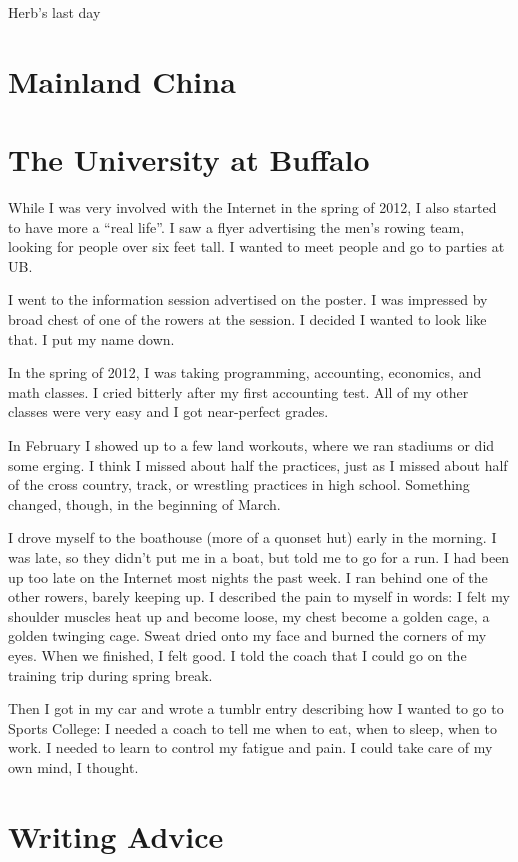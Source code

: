 \documentclass[12pt]{memoir}
\begin{document}
Herb's last day

  
\chapter{Mainland China}



\chapter{The University at Buffalo}
While I was very involved with the Internet in the spring of 2012, I also
started to have more a ``real life''.  I saw a flyer advertising the men's
rowing team, looking for people over six feet tall.   I wanted to
meet people and go to parties at UB. 

I went to the information session advertised on the poster.  I was impressed by
 broad chest of one of the rowers at the session.  I decided I
wanted to look like that.  I put my name down.

In the spring of 2012, I was taking programming, accounting, economics, and
math classes.  I cried bitterly after my first accounting test.  All of my
other classes were very easy and I got near-perfect grades.

In February I showed up to a few land workouts, where we ran stadiums or did
some erging.  I think I missed about half the practices, just as I missed about
half of the cross country, track, or wrestling practices in high school.
Something changed, though, in the beginning of March.

I drove myself to the boathouse (more of a quonset hut) early in the
morning.  I was late, so they didn't put me in a boat, but told me to go for a
run.  I had been up too late on the Internet most nights the past week.  I ran
behind one of the other rowers, barely keeping up.  I described the pain to
myself in words: I felt my shoulder muscles heat up and become loose, my chest
become a golden cage, a golden twinging cage.  Sweat dried onto my face and
burned the corners of my eyes.  When we finished, I felt good.  I told the coach
that I could go on the training trip during spring break.  

Then I got in my car and wrote a tumblr entry describing how I wanted to go to
Sports College: I needed a coach to tell me when to eat, when to sleep, when to
work.  I needed to learn to control my fatigue and pain.  I could take care of
my own mind, I thought.


\chapter{Writing Advice}
\end{document}
